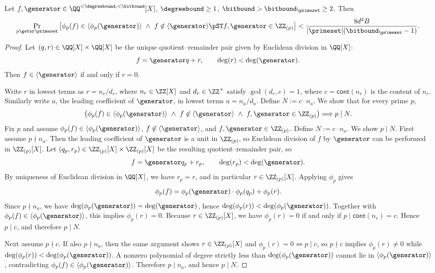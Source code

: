 \begin{lemma}
\label{lemma:phi-collision}
Let $f,\generator \in \QQ^{<\degreebound,<\bitbound}[X]$, $\degreebound \ge 1$, $\bitbound > \bitbound_\primeset \ge 2$.
Then
\[
\Pr_{p \getsr \primeset}\left[\phi_p(f) \in \langle \phi_p(\generator) \rangle \ \wedge\ f \not\in \langle \generator \rangle \pST f,\generator \in \ZZ_{(p)}\right]
< \frac{8 d^2 B}{|\primeset|(\bitbound_\primeset-1)}.
\]
\end{lemma}
\begin{proof}
Let $(q,r) \in \QQ[X]\times \QQ[X]$ be the unique quotient--remainder pair given by Euclidean division in $\QQ[X]$:
\[
f = \generator q + r,
\qquad
\deg(r) < \deg(\generator).
\]
Then $f \in \langle \generator\rangle$ if and only if $r=0$.

Write $r$ in lowest terms as $r=n_r/d_r$, where $n_r\in \ZZ[X]$ and $d_r\in \ZZ^{+}$ satisfy $\gcd(d_r,c)=1$, where $c = \mathsf{cont}(n_r)$ is the content of $n_r$. Similarly write $a$, the leading coefficient of $\generator$, in lowest terms $a = n_a/d_a$. Define $N := c \cdot n_a$. We show that for every prime $p$,
\[
\left(\phi_p(f) \in \langle \phi_p(\generator) \rangle \ \wedge\ f \not\in \langle \generator \rangle \ \wedge\ f,\generator \in \ZZ_{(p)}\right)
\Longrightarrow p \mid N.
\]
Fix $p$ and assume $\phi_p(f) \in \langle \phi_p(\generator) \rangle$, $f \not\in \langle \generator \rangle$, and $f,\generator \in \ZZ_{(p)}$.
Define $N := c \cdot n_a$. We show $p \mid N$. First assume $p \nmid n_a$. Then the leading coefficient of $\generator$ is a unit in $\ZZ_{(p)}$, so Euclidean division of $f$ by $\generator$ can be performed in $\ZZ_{(p)}[X]$. Let $(q_p,r_p)\in \ZZ_{(p)}[X]\times \ZZ_{(p)}[X]$ be the resulting quotient--remainder pair, so
\[
f = \generator q_p + r_p,
\qquad
\deg(r_p) < \deg(\generator).
\]
By uniqueness of Euclidean division in $\QQ[X]$, we have $r_p=r$, and in particular $r\in \ZZ_{(p)}[X]$. Applying $\phi_p$ gives
\[
\phi_p(f) = \phi_p(\generator)\cdot \phi_p(q_p) + \phi_p(r).
\]
Since $p \nmid n_a$, we have $\deg(\phi_p(\generator))=\deg(\generator)$, hence $\deg(\phi_p(r))<\deg(\phi_p(\generator))$.  Together with $\phi_p(f)\in \langle \phi_p(\generator)\rangle$, this implies $\phi_p(r)=0$. Because $r\in \ZZ_{(p)}[X]$, we have $\phi_p(r)=0$ if and only if $p \mid \mathsf{cont}(n_r)=c$. Hence $p \mid c$, and therefore $p \mid N$.

Next assume $p \nmid c$. If also $p \nmid n_a$, then the same argument shows $r\in \ZZ_{(p)}[X]$ and $\phi_p(r)=0 \Longleftrightarrow p \mid c$, so $p \nmid c$ implies $\phi_p(r)\neq 0$ while $\deg(\phi_p(r))<\deg(\phi_p(\generator))$. A nonzero polynomial of degree strictly less than $\deg(\phi_p(\generator))$ cannot lie in $\langle \phi_p(\generator)\rangle$, contradicting $\phi_p(f)\in \langle \phi_p(\generator)\rangle$.  Therefore $p \mid n_a$, and hence $p \mid N$.


\end{proof}
